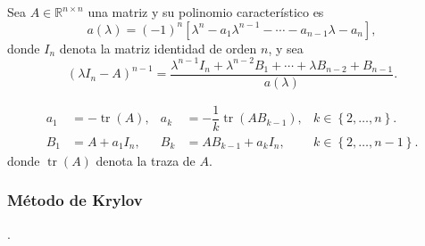\begin{frame}
	Sea $A\in\mathbb{R}^{n\times n}$ una matriz y su polinomio
	característico es
	\begin{equation*}
		a\left(\lambda\right)=
		\left(-1\right)^{n}
		\left[
		\lambda^{n}-a_{1}\lambda^{n-1}-\cdots-a_{n-1}\lambda-a_{n}
		\right],
	\end{equation*}
	donde $I_{n}$ denota la matriz identidad de orden $n$, y sea
	\begin{equation*}
		{\left(\lambda I_{n}-A\right)}^{n-1}=
		\dfrac{
		\lambda^{n-1}I_{n}+
		\lambda^{n-2}B_{1}+
		\cdots+
		\lambda B_{n-2}+
		B_{n-1}
		}{a\left(\lambda\right)}.
	\end{equation*}

	\begin{align*}
		a_{1} & =-\operatorname{tr}\left(A\right),                    &
		a_{k} & =-\dfrac{1}{k}\operatorname{tr}\left(AB_{k-1}\right),
		      & k\in\left\{2,\dotsc,n\right\}.                          \\
		B_{1} & = A + a_{1}I_{n},                                     &
		B_{k} & =AB_{k-1}+a_{k}I_{n},
		      & k\in\left\{2,\dotsc,n-1\right\}.
	\end{align*}
	donde $\operatorname{tr}\left(A\right)$ denota la traza de $A$.
\end{frame}

\begin{frame}
	\frametitle{Método de Krylov}

	.
\end{frame}

